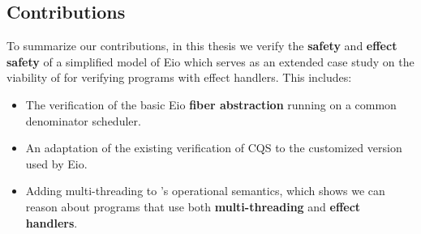 \subsection{Contributions}
\label{sec:intro-contributions}

To summarize our contributions, in this thesis we verify the \textbf{safety} and \textbf{effect safety} of a simplified model of Eio which serves as an extended case study on the viability of \hazel{} for verifying programs with effect handlers.
This includes:

\begin{itemize}
  \item The verification of the basic Eio \textbf{fiber abstraction} running on a common denominator scheduler.
  \item An adaptation of the existing verification of CQS to the customized version used by Eio.
  \item Adding multi-threading to \hazel{}'s operational semantics, which shows we can reason about programs that use both \textbf{multi-threading} and \textbf{effect handlers}.
\end{itemize}
